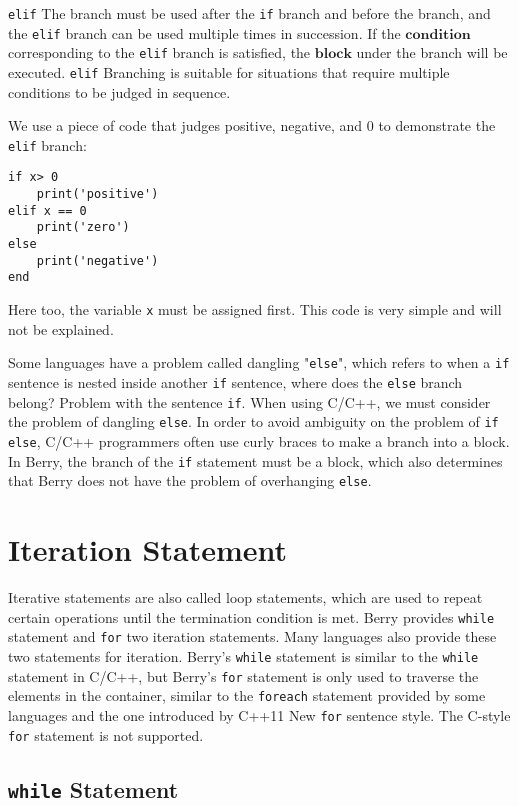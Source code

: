 \texttt{elif} The branch must be used after the \texttt{if} branch and before the  branch, and the \texttt{elif} branch can be used multiple times in succession. If the $\bm{condition}$ corresponding to the \texttt{elif} branch is satisfied, the $\bm{block}$ under the branch will be executed. \texttt{elif} Branching is suitable for situations that require multiple conditions to be judged in sequence.

We use a piece of code that judges positive, negative, and 0 to demonstrate the \texttt{elif} branch:
\begin{lstlisting}[language=berry, numbers=none]
if x> 0
    print('positive')
elif x == 0
    print('zero')
else
    print('negative')
end
\end{lstlisting}
Here too, the variable \texttt{x} must be assigned first. This code is very simple and will not be explained.

Some languages   have a problem called dangling "\texttt{else}", which refers to when a \texttt{if} sentence is nested inside another \texttt{if} sentence, where does the \texttt{else} branch belong? Problem with the sentence \texttt{if}. When using C/C++, we must consider the problem of dangling \texttt{else}. In order to avoid ambiguity on the problem of \texttt{if else}, C/C++ programmers often use curly braces to make a branch into a block. In Berry, the branch of the \texttt{if} statement must be a block, which also determines that Berry does not have the problem of overhanging \texttt{else}.

\section {Iteration Statement}

Iterative statements are also called loop statements, which are used to repeat certain operations until the termination condition is met. Berry provides \texttt{while} statement and \texttt{for} two iteration statements. Many languages   also provide these two statements for iteration. Berry’s \texttt{while} statement is similar to the \texttt{while} statement in C/C++, but Berry’s \texttt{for} statement is only used to traverse the elements in the container, similar to the \texttt{foreach} statement provided by some languages   and the one introduced by C++11 New \texttt{for} sentence style. The C-style \texttt{for} statement is not supported.

\subsection{\texttt{while} Statement}

